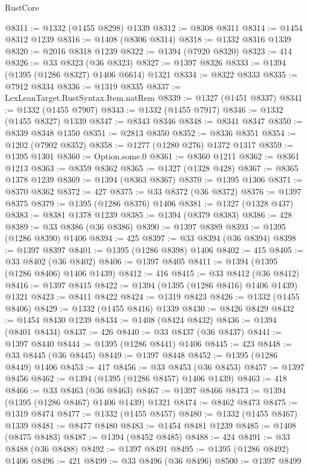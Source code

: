 \begin{lexlean}{RustCore}
\begin{coremodule}
@8311 := @1332 (@1455 @8298) @1339
@8312 := @8308 @8311
@8314 := @1454 @8312 @1239
@8316 := @1408 (@8306 @8314)
@8318 := @1332 @8316 @1339
@8320 := @2016 @8318 @1239
@8322 := @1394 (@7920 @8320)
@8323 := 414
@8326 := @33 @8323 (@36 @8323)
@8327 := @1397 @8326
@8333 := @1394 (@1395 (@1286 @8327) @1406 @6614) @1321
@8334 := @8322 @8333
@8335 := @7912 @8334
@8336 := @1319 @8335
@8337 := LexLeanTarget.RustSyntax.Item.natRem
@8339 := @1327 (@1451 @8337)
@8341 := @1332 (@1455 @7907)
@8343 := @1332 (@1455 @7917)
@8346 := @1332 (@1455 @8327) @1339
@8347 := @8343 @8346
@8348 := @8341 @8347
@8350 := @8339 @8348 @1350
@8351 := @2813 @8350
@8352 := @8336 @8351
@8354 := @1202 (@7902 @8352)
@8358 := @1277 (@1280 @276) @1372 @1317
@8359 := @1395 @1301
@8360 := Option.some.{0}
@8361 := @8360 @1211
@8362 := @8361 @1213
@8363 := @8359 @8362
@8365 := @1327 (@1328 @428)
@8367 := @8365 @1378 @1239
@8369 := @1394 (@8363 @8367)
@8370 := @1395 @1306
@8371 := @8370 @8362
@8372 := 427
@8375 := @33 @8372 (@36 @8372)
@8376 := @1397 @8375
@8379 := @1395 (@1286 @8376) @1406
@8381 := @1327 (@1328 @437)
@8383 := @8381 @1378 @1239
@8385 := @1394 (@8379 @8383)
@8386 := 428
@8389 := @33 @8386 (@36 @8386)
@8390 := @1397 @8389
@8393 := @1395 (@1286 @8390) @1406
@8394 := 425
@8397 := @33 @8394 (@36 @8394)
@8398 := @1397 @8397
@8401 := @1395 (@1286 @8398) @1406
@8402 := 415
@8405 := @33 @8402 (@36 @8402)
@8406 := @1397 @8405
@8411 := @1394 (@1395 (@1286 @8406) @1406 @1439)
@8412 := 416
@8415 := @33 @8412 (@36 @8412)
@8416 := @1397 @8415
@8422 := @1394 (@1395 (@1286 @8416) @1406 @1439) @1321
@8423 := @8411 @8422
@8424 := @1319 @8423
@8426 := @1332 (@1455 @8406)
@8429 := @1332 (@1455 @8416) @1339
@8430 := @8426 @8429
@8432 := @1454 @8430 @1239
@8434 := @1408 (@8424 @8432)
@8436 := @1394 (@8401 @8434)
@8437 := 426
@8440 := @33 @8437 (@36 @8437)
@8441 := @1397 @8440
@8444 := @1395 (@1286 @8441) @1406
@8445 := 423
@8448 := @33 @8445 (@36 @8445)
@8449 := @1397 @8448
@8452 := @1395 (@1286 @8449) @1406
@8453 := 417
@8456 := @33 @8453 (@36 @8453)
@8457 := @1397 @8456
@8462 := @1394 (@1395 (@1286 @8457) @1406 @1439)
@8463 := 418
@8466 := @33 @8463 (@36 @8463)
@8467 := @1397 @8466
@8473 := @1394 (@1395 (@1286 @8467) @1406 @1439) @1321
@8474 := @8462 @8473
@8475 := @1319 @8474
@8477 := @1332 (@1455 @8457)
@8480 := @1332 (@1455 @8467) @1339
@8481 := @8477 @8480
@8483 := @1454 @8481 @1239
@8485 := @1408 (@8475 @8483)
@8487 := @1394 (@8452 @8485)
@8488 := 424
@8491 := @33 @8488 (@36 @8488)
@8492 := @1397 @8491
@8495 := @1395 (@1286 @8492) @1406
@8496 := 421
@8499 := @33 @8496 (@36 @8496)
@8500 := @1397 @8499

\end{coremodule}
\end{lexlean}
